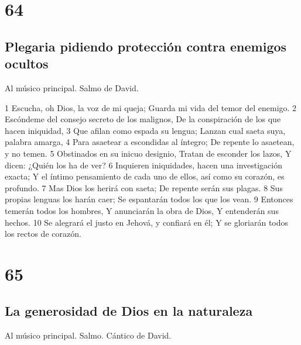 \chapter{64}

\section*{Plegaria pidiendo protección contra enemigos ocultos}

Al músico principal. Salmo de David.

1 Escucha, oh Dios, la voz de mi queja;
Guarda mi vida del temor del enemigo.
2 Escóndeme del consejo secreto de los malignos,
De la conspiración de los que hacen iniquidad,
3 Que afilan como espada su lengua;
Lanzan cual saeta suya, palabra amarga,
4 Para asaetear a escondidas al íntegro;
De repente lo asaetean, y no temen.
5 Obstinados en su inicuo designio,
Tratan de esconder los lazos,
Y dicen: ¿Quién los ha de ver?
6 Inquieren iniquidades, hacen una investigación exacta;
Y el íntimo pensamiento de cada uno de ellos, así como su corazón, es profundo.
7 Mas Dios los herirá con saeta;
De repente serán sus plagas.
8 Sus propias lenguas los harán caer;
Se espantarán todos los que los vean.
9 Entonces temerán todos los hombres,
Y anunciarán la obra de Dios,
Y entenderán sus hechos.
10 Se alegrará el justo en Jehová, y confiará en él;
Y se gloriarán todos los rectos de corazón.

\chapter{65}

\section*{La generosidad de Dios en la naturaleza}

Al músico principal. Salmo. Cántico de David.

